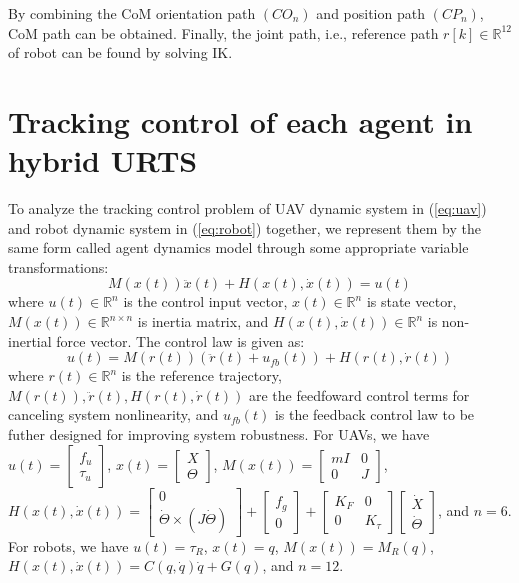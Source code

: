 \documentclass{ieeeaccess}
\begin{document}
By combining the CoM orientation path $(CO_n)$ and position path $(CP_n)$, CoM path can be obtained. Finally, the joint path, i.e., reference path $r[k]\in\mathbb{R}^{12}$ of robot can be found by solving IK.

\section{Tracking control of each agent in hybrid URTS}
To analyze the tracking control problem of UAV dynamic system in (\ref{eq:uav}) and robot dynamic system in (\ref{eq:robot}) together, we represent them by the same form called agent dynamics model through some appropriate variable transformations:
\begin{equation} \label{eq:agent} 
    M(x(t))\ddot{x}(t) + H(x(t),\dot{x}(t)) = u(t)
\end{equation}
where $u(t)\in\mathbb{R}^n$ is the control input vector, $x(t)\in\mathbb{R}^n$ is state vector, $M(x(t))\in\mathbb{R}^{n\times n}$ is inertia matrix, and $H(x(t),\dot{x}(t))\in\mathbb{R}^n$ is non-inertial force vector. The control law is given as:
\begin{equation} \label{eq:control}
    u(t)= M(r(t))(\ddot{r}(t) + u_{fb}(t)) + H(r(t),\dot{r}(t)) 
\end{equation}
where $r(t)\in\mathbb{R}^n$ is the reference trajectory, $M(r(t)), \ddot{r}(t)\mathbin{,} H(r(t), \dot{r}(t))$ are the feedfoward control terms for canceling system nonlinearity, and $u_{fb}(t)$ is the feedback control law to be futher designed for improving system robustness. For UAVs, we have $u(t)=\begin{bmatrix}
    f_u \\ \tau_u
\end{bmatrix}$, $x(t)=\begin{bmatrix}
    X \\ \Theta
\end{bmatrix}$, $M(x(t))=\begin{bmatrix}
    mI & 0 \\ 0 & J
\end{bmatrix}$, $H(x(t),\dot{x}(t))=\begin{bmatrix}
    0 \\ \dot{\Theta}\times(J\dot{\Theta})
\end{bmatrix}+\begin{bmatrix}
    f_g \\ 0
\end{bmatrix}+\begin{bmatrix}
    K_F & 0 \\
    0 & K_\tau
\end{bmatrix}\begin{bmatrix}
    \dot{X} \\ \dot{\Theta}
\end{bmatrix}$, and $n=6$. For robots, we have $u(t)=\tau_R$, $x(t)=q$, $M(x(t))=M_R(q)$, $H(x(t),\dot{x}(t))=C(q,\dot{q})\dot{q} + G(q)$, and $n=12$.
\end{document}
